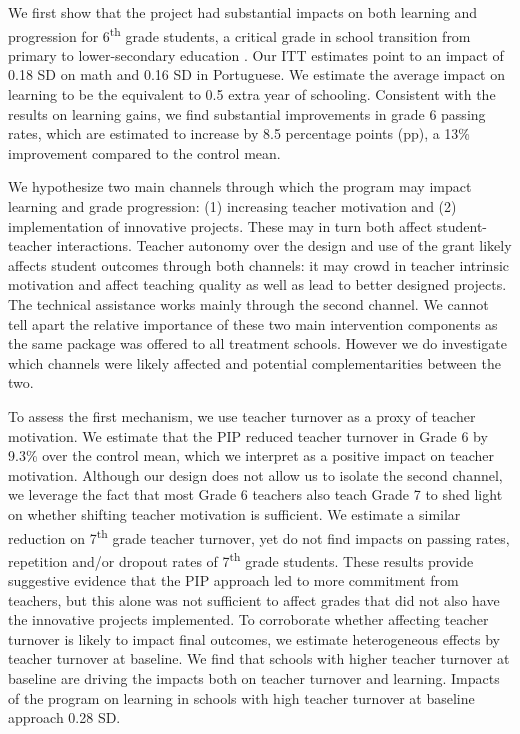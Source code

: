 \documentclass[11pt,a4paper]{article}
\begin{document}
	
	We first show that the project had substantial impacts on both learning and progression for 6\textsuperscript{th} grade students, a critical grade in school transition from primary to lower-secondary education \citep{Santos2017}. Our ITT estimates point to an impact of 0.18 SD on math and 0.16 SD in Portuguese. We estimate the average impact on learning to be the equivalent to 0.5 extra year of schooling. Consistent with the results on learning gains, we find substantial improvements in grade 6 passing rates, which are estimated to increase by 8.5 percentage points (pp), a 13\% improvement compared to the control mean.
	
	
	We hypothesize two main channels through which the program may impact learning and grade progression: (1) increasing teacher motivation and (2) implementation of innovative projects. These may in turn both affect student-teacher interactions. Teacher autonomy over the design and use of the grant likely affects student outcomes through both channels: it may crowd in teacher intrinsic motivation and affect teaching quality as well as lead to better designed projects. The technical assistance works mainly through the second channel. We cannot tell apart the relative importance of these two main intervention components as the same package was offered to all treatment schools. However we do investigate which channels were likely affected and potential complementarities between the two.  
	
	
	To assess the first mechanism, we use teacher turnover as a proxy of teacher motivation. We estimate that the PIP reduced teacher turnover in Grade 6 by 9.3\% over the control mean, which we interpret as a positive impact on teacher motivation. Although our design does not allow us to isolate the second channel, we leverage the fact that most Grade 6 teachers also teach Grade 7 to shed light on whether shifting teacher motivation is sufficient. We estimate a similar reduction on 7\textsuperscript{th} grade teacher turnover, yet do not find impacts on passing rates, repetition and/or dropout rates of 7\textsuperscript{th} grade students. These results provide suggestive evidence that the PIP approach led to more commitment from teachers, but this alone was not sufficient to affect grades that did not also have the innovative projects implemented. To corroborate whether affecting teacher turnover is likely to impact final outcomes, we estimate heterogeneous effects by teacher turnover at baseline. We find that schools with higher teacher turnover at baseline are driving the impacts both on teacher turnover and learning. Impacts of the program on learning in schools with high teacher turnover at baseline approach 0.28 SD. 
	
\end{document}
